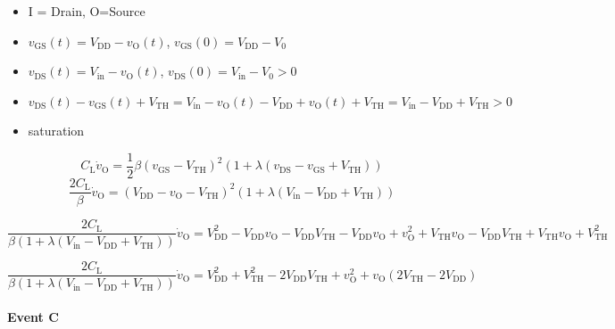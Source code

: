 \documentclass{article}[11pt]
\begin{document}
\begin{itemize}
\item I = Drain, O=Source
\item $v_{\mathrm{GS}}(t) = V_{\mathrm{DD}}-v_{\mathrm{O}}(t)$, $v_{\mathrm{GS}}(0) = V_{\mathrm{DD}}-V_0$
\item $v_{\mathrm{DS}}(t) = V_{\mathrm{in}}-v_{\mathrm{O}}(t)$, $v_{\mathrm{DS}}(0) = V_{\mathrm{in}}-V_0 >0$
\item $v_{\mathrm{DS}}(t)- v_{\mathrm{GS}}(t) + V_{\mathrm{TH}}  = V_{\mathrm{in}}-v_{\mathrm{O}}(t) - V_{\mathrm{DD}}+v_{\mathrm{O}}(t) + V_{\mathrm{TH}} = V_{\mathrm{in}}-V_{\mathrm{DD}} + V_{\mathrm{TH}}>0$
\item saturation
\end{itemize}
\begin{equation}
C_{\mathrm{L}} \dot{v}_{\mathrm{O}} = 
\frac{1}{2} \beta \left(v_{\mathrm{GS}}-V_{\mathrm{TH}}\right)^2 \left(1+\lambda \left(v_{\mathrm{DS}}-v_{\mathrm{GS}}+V_{\mathrm{TH}}\right)\right)
\end{equation}
\begin{equation}
\frac{2C_{\mathrm{L}}}{\beta} \dot{v}_{\mathrm{O}} = 
\left(V_{\mathrm{DD}}-v_{\mathrm{O}}-V_{\mathrm{TH}}\right)^2 \left(1+\lambda \left(V_{\mathrm{in}}-V_{\mathrm{DD}} + V_{\mathrm{TH}}\right)\right)
\end{equation}

\begin{equation}
\frac{2C_{\mathrm{L}}}{\beta \left(1+\lambda \left(V_{\mathrm{in}}-V_{\mathrm{DD}} + V_{\mathrm{TH}}\right)\right)} \dot{v}_{\mathrm{O}} = 
V_{\mathrm{DD}}^2 - V_{\mathrm{DD}} v_{\mathrm{O}} - V_{\mathrm{DD}} V_{\mathrm{TH}}
- V_{\mathrm{DD}} v_{\mathrm{O}} + v_{\mathrm{O}}^2 + V_{\mathrm{TH}} v_{\mathrm{O}}
- V_{\mathrm{DD}} V_{\mathrm{TH}} + V_{\mathrm{TH}} v_{\mathrm{O}} + V_{\mathrm{TH}}^2
\end{equation}

\begin{equation}
\frac{2C_{\mathrm{L}}}{\beta \left(1+\lambda \left(V_{\mathrm{in}}-V_{\mathrm{DD}} + V_{\mathrm{TH}}\right)\right)} \dot{v}_{\mathrm{O}} = 
V_{\mathrm{DD}}^2 + V_{\mathrm{TH}}^2 -2 V_{\mathrm{DD}} V_{\mathrm{TH}}
+ v_{\mathrm{O}}^2 + v_{\mathrm{O}} \left(2V_{\mathrm{TH}}-2V_{\mathrm{DD}}\right)
\end{equation}

\paragraph{Event C}
\end{document}
